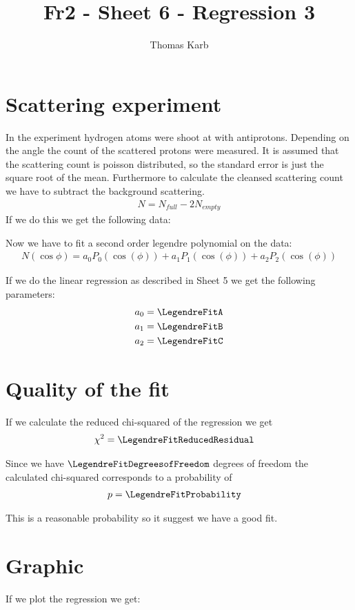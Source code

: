 \documentclass[11pt]{article}
\title{Fr2 - Sheet 6 - Regression 3}
\author{Thomas Karb}
\begin{document}
    \maketitle
    
    \section{Scattering experiment}
    
    In the experiment hydrogen atoms were shoot at with antiprotons.
    Depending on the angle the count of the scattered protons were measured.
    It is assumed that the scattering count is poisson distributed, so the standard error
    is just the square root of the mean. 
    Furthermore to calculate the cleansed scattering count we have to subtract the background scattering.
    \begin{align*}
        N = N_{full} - 2 N_{empty}
    \end{align*}
    If we do this we get the following data:
    
    
    
    Now we have to fit a second order legendre polynomial on the data:
    \begin{align*}
        N(\cos{\phi}) = a_0 P_0 (\cos(\phi)) + a_1 P_1 (\cos(\phi)) + a_2 P_2 (\cos(\phi))
    \end{align*}
    
    If we do the linear regression as described in Sheet 5 we get the following parameters:
    \begin{align*}
        a_0 &= \LegendreFitA \\
        a_1 &= \LegendreFitB \\
        a_2 &= \LegendreFitC
    \end{align*}
    
    
    \section{Quality of the fit}
    
    If we calculate the reduced chi-squared of the regression we get
    \begin{align*}
        \chi^2 &= \LegendreFitReducedResidual
    \end{align*}
    
    Since we have $\LegendreFitDegreesofFreedom$ degrees of freedom the calculated chi-squared 
    corresponds to a probability of
    \begin{align*}
        p &= \LegendreFitProbability
    \end{align*}
    
    This is a reasonable probability so it suggest we have a good fit. 
    
    \section{Graphic}
    
    If we plot the regression we get:
    
    \figLegendreFit
\end{document}

